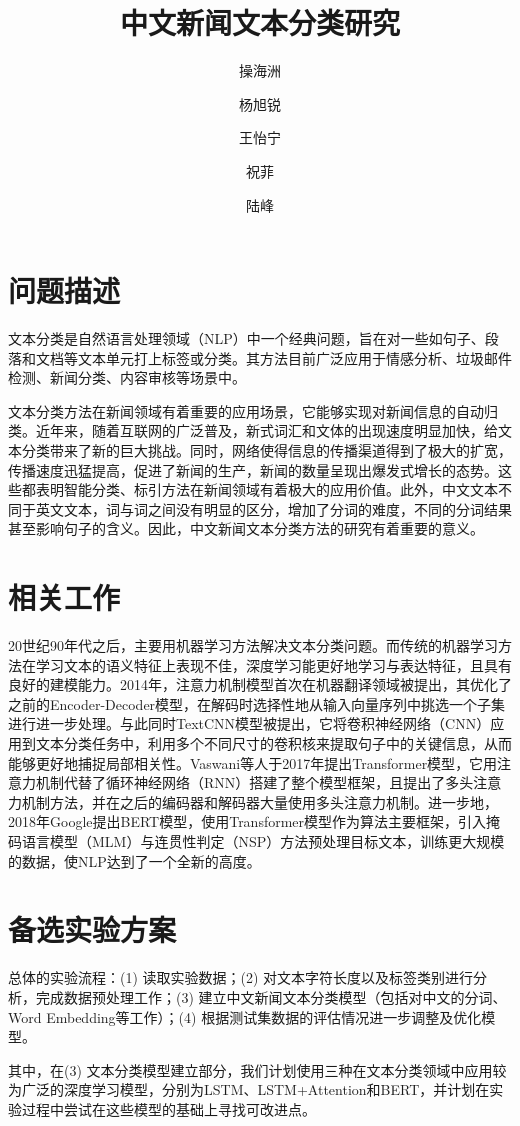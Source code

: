 \documentclass[sigplan]{acmart}
\author {操海洲}
\affiliation{%
  \institution{202028016029011}
}
\author {杨旭锐}
\affiliation{%
  \institution{2020E8013282023}
}
\author {王怡宁}
\affiliation{%
  \institution{2020E8016082028}
}
\author {祝菲}
\affiliation{%
  \institution{202028018629033}
}
\author {陆峰}
\affiliation{%
  \institution{2020E8013282001}
}
\begin{document}
		\title{中文新闻文本分类研究}

		\maketitle
		
		\section{问题描述}
		\hspace{2.0em}\setlength{\parindent}{2em}文本分类是自然语言处理领域（NLP）中一个经典问题，旨在对一些如句子、段落和文档等文本单元打上标签或分类。其方法目前广泛应用于情感分析、垃圾邮件检测、新闻分类、内容审核等场景中。
		\par 文本分类方法在新闻领域有着重要的应用场景，它能够实现对新闻信息的自动归类。近年来，随着互联网的广泛普及，新式词汇和文体的出现速度明显加快，给文本分类带来了新的巨大挑战。同时，网络使得信息的传播渠道得到了极大的扩宽，传播速度迅猛提高，促进了新闻的生产，新闻的数量呈现出爆发式增长的态势。这些都表明智能分类、标引方法在新闻领域有着极大的应用价值。此外，中文文本不同于英文文本，词与词之间没有明显的区分，增加了分词的难度，不同的分词结果甚至影响句子的含义。因此，中文新闻文本分类方法的研究有着重要的意义。
		
		
		\section{相关工作}
		\hspace{2.0em}20世纪90年代之后，主要用机器学习方法解决文本分类问题。而传统的机器学习方法在学习文本的语义特征上表现不佳，深度学习能更好地学习与表达特征，且具有良好的建模能力。2014年，注意力机制模型首次在机器翻译领域被提出\cite{1409.0473}，其优化了之前的Encoder-Decoder模型，在解码时选择性地从输入向量序列中挑选一个子集进行进一步处理。与此同时TextCNN模型被提出\cite{1408.5882}，它将卷积神经网络（CNN）应用到文本分类任务中，利用多个不同尺寸的卷积核来提取句子中的关键信息，从而能够更好地捕捉局部相关性。Vaswani等人于2017年提出Transformer模型\cite{1706.03762}，它用注意力机制代替了循环神经网络（RNN）搭建了整个模型框架，且提出了多头注意力机制方法，并在之后的编码器和解码器大量使用多头注意力机制。进一步地，2018年Google提出BERT模型\cite{1810.04805}，使用Transformer模型作为算法主要框架，引入掩码语言模型（MLM）与连贯性判定（NSP）方法预处理目标文本，训练更大规模的数据，使NLP达到了一个全新的高度。

		
		\section{备选实验方案}
		\hspace{2.0em}\setlength{\parindent}{2.1em}总体的实验流程：(1) 读取实验数据；(2) 对文本字符长度以及标签类别进行分析，完成数据预处理工作；(3) 建立中文新闻文本分类模型（包括对中文的分词、Word Embedding等工作）；(4) 根据测试集数据的评估情况进一步调整及优化模型。
		\par 其中，在(3) 文本分类模型建立部分，我们计划使用三种在文本分类领域中应用较为广泛的深度学习模型，分别为LSTM、LSTM+Attention和BERT，并计划在实验过程中尝试在这些模型的基础上寻找可改进点。
\end{document}
